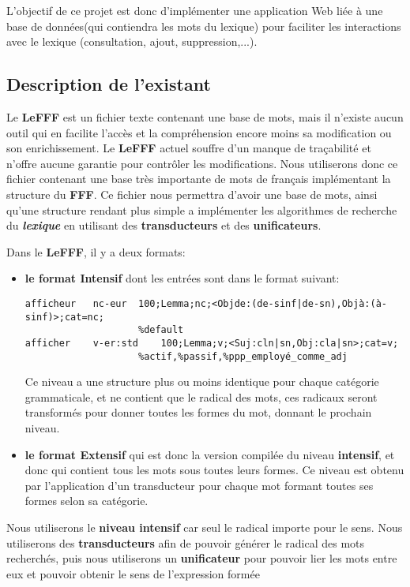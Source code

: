{L'objectif de ce projet est donc d'implémenter une application Web liée à une base de données(qui contiendra les mots du lexique) pour faciliter les interactions avec le lexique (consultation, ajout, suppression,...).\par}


\subsection{Description de l'existant }
{Le \textbf{LeFFF} est un fichier texte contenant une base de mots, mais il n'existe aucun outil qui en facilite l'accès et la compréhension encore moins sa modification ou son enrichissement. Le \textbf{LeFFF} actuel souffre d'un manque de traçabilité et n'offre aucune garantie pour contrôler les modifications. Nous utiliserons donc ce fichier contenant une base très importante de mots de français implémentant la structure du \textbf{FFF}. Ce fichier nous permettra d'avoir une base de mots, ainsi qu'une structure rendant plus simple a implémenter les algorithmes de recherche du \textit{\bf lexique} en utilisant des \textbf{transducteurs} et des \textbf{unificateurs}.\par}
{Dans le \textbf{LeFFF}, il y a deux formats:\par}
\begin{itemize}
\item \textbf{le format Intensif} dont les entrées sont dans le format suivant:
\small
\begin{verbatim}
afficheur	nc-eur	100;Lemma;nc;<Objde:(de-sinf|de-sn),Objà:(à-sinf)>;cat=nc;
                    %default
afficher	v-er:std	100;Lemma;v;<Suj:cln|sn,Obj:cla|sn>;cat=v;
                    %actif,%passif,%ppp_employé_comme_adj
\end{verbatim}
\normalsize
Ce niveau a une structure plus ou moins identique pour chaque catégorie grammaticale, et ne contient que le radical des mots, ces radicaux seront transformés pour donner toutes les formes du mot, donnant le prochain niveau.
\item \textbf{le format Extensif} qui est donc la version compilée du niveau \textbf{intensif}, et donc qui contient tous les mots sous toutes leurs formes. Ce niveau est obtenu par l'application d'un transducteur pour chaque mot formant toutes ses formes selon sa catégorie.
\end{itemize}
{Nous utiliserons le \textbf{niveau intensif} car seul le radical importe pour le sens. Nous utiliserons des \textbf{transducteurs} afin de pouvoir générer le radical des mots recherchés, puis nous utiliserons un \textbf{unificateur} pour pouvoir lier les mots entre eux et pouvoir obtenir le sens de l'expression formée}
